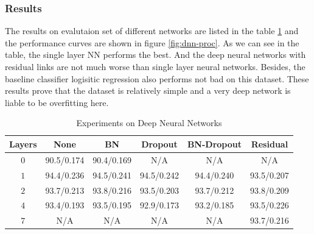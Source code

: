 \documentclass{article}
\begin{document}
			\subsubsection*{Results}
				The results on evalutaion set of different networks are listed in the table \ref{table:dnn-res} and the performance curves are shown in figure \ref{fig:dnn-proc}. As we can see in the table, the single layer NN performs the best. And the deep neural networks with residual links are not much worse than single layer neural networks. Besides, the baseline classifier logisitic regression also performs not bad on this dataset. These results prove that the dataset is relatively simple and a very deep network is liable to be overfitting here.
				\begin{table}[htbp]
					\centering
					\begin{tabular}{c|ccccc}
						\hline
						\hline
						          Layers   & None & BN & Dropout & BN-Dropout & Residual \\
						\hline
						$0$  & 90.5/0.174 & 90.4/0.169 & N/A & N/A & N/A \\
						$1$  & 94.4/0.236 & 94.5/0.241 & 94.5/0.242 & 94.4/0.240 & 93.5/0.207\\
						$2$  & 93.7/0.213 & 93.8/0.216 & 93.5/0.203 & 93.7/0.212 & 93.8/0.209\\
						$4$  & 93.4/0.193 & 93.5/0.195 & 92.9/0.173 & 93.2/0.185 & 93.5/0.226\\
						$7$\footnotemark  & N/A & N/A & N/A & N/A & 93.7/0.216 \\
						\hline
					\end{tabular}
					\caption{\label{table:dnn-res}Experiments on Deep Neural Networks}
				\end{table}
\end{document}
